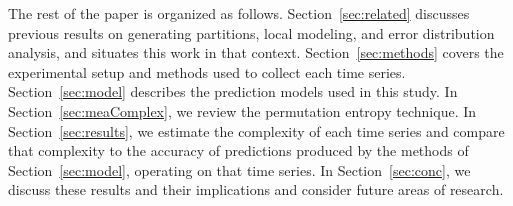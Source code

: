 

The rest of the paper is organized as follows.
Section~\ref{sec:related} discusses previous results on generating
partitions, local modeling, and error distribution analysis, and
situates this work in that context. Section~\ref{sec:methods} covers
the experimental setup and methods used to collect each time
series. Section~\ref{sec:model} describes the prediction models used
in this study.  In Section~\ref{sec:meaComplex}, we review the
permutation entropy technique.  In Section~\ref{sec:results}, we estimate the
complexity of each time series and compare that complexity to the
accuracy of predictions produced by the methods of
Section~\ref{sec:model}, operating on that time series.  In
Section~\ref{sec:conc}, we discuss these results and their
implications and consider future areas of research.


